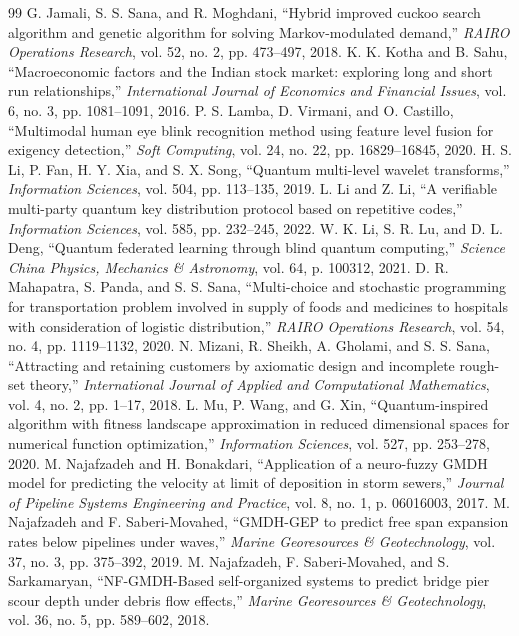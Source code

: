 \documentclass[conference]{IEEEtran}
\begin{document}
\begin{thebibliography}{99}
 G. Jamali, S. S. Sana, and R. Moghdani, ``Hybrid improved cuckoo search algorithm and genetic algorithm for solving Markov-modulated demand,'' \emph{RAIRO Operations Research}, vol. 52, no. 2, pp. 473--497, 2018.
 K. K. Kotha and B. Sahu, ``Macroeconomic factors and the Indian stock market: exploring long and short run relationships,'' \emph{International Journal of Economics and Financial Issues}, vol. 6, no. 3, pp. 1081--1091, 2016.
 P. S. Lamba, D. Virmani, and O. Castillo, ``Multimodal human eye blink recognition method using feature level fusion for exigency detection,'' \emph{Soft Computing}, vol. 24, no. 22, pp. 16829--16845, 2020.
 H. S. Li, P. Fan, H. Y. Xia, and S. X. Song, ``Quantum multi-level wavelet transforms,'' \emph{Information Sciences}, vol. 504, pp. 113--135, 2019.
 L. Li and Z. Li, ``A verifiable multi-party quantum key distribution protocol based on repetitive codes,'' \emph{Information Sciences}, vol. 585, pp. 232--245, 2022.
 W. K. Li, S. R. Lu, and D. L. Deng, ``Quantum federated learning through blind quantum computing,'' \emph{Science China Physics, Mechanics \& Astronomy}, vol. 64, p. 100312, 2021.
 D. R. Mahapatra, S. Panda, and S. S. Sana, ``Multi-choice and stochastic programming for transportation problem involved in supply of foods and medicines to hospitals with consideration of logistic distribution,'' \emph{RAIRO Operations Research}, vol. 54, no. 4, pp. 1119--1132, 2020.
 N. Mizani, R. Sheikh, A. Gholami, and S. S. Sana, ``Attracting and retaining customers by axiomatic design and incomplete rough-set theory,'' \emph{International Journal of Applied and Computational Mathematics}, vol. 4, no. 2, pp. 1--17, 2018.
 L. Mu, P. Wang, and G. Xin, ``Quantum-inspired algorithm with fitness landscape approximation in reduced dimensional spaces for numerical function optimization,'' \emph{Information Sciences}, vol. 527, pp. 253--278, 2020.
 M. Najafzadeh and H. Bonakdari, ``Application of a neuro-fuzzy GMDH model for predicting the velocity at limit of deposition in storm sewers,'' \emph{Journal of Pipeline Systems Engineering and Practice}, vol. 8, no. 1, p. 06016003, 2017.
 M. Najafzadeh and F. Saberi-Movahed, ``GMDH-GEP to predict free span expansion rates below pipelines under waves,'' \emph{Marine Georesources \& Geotechnology}, vol. 37, no. 3, pp. 375--392, 2019.
 M. Najafzadeh, F. Saberi-Movahed, and S. Sarkamaryan, ``NF-GMDH-Based self-organized systems to predict bridge pier scour depth under debris flow effects,'' \emph{Marine Georesources \& Geotechnology}, vol. 36, no. 5, pp. 589--602, 2018.

\end{thebibliography}
\end{document}
